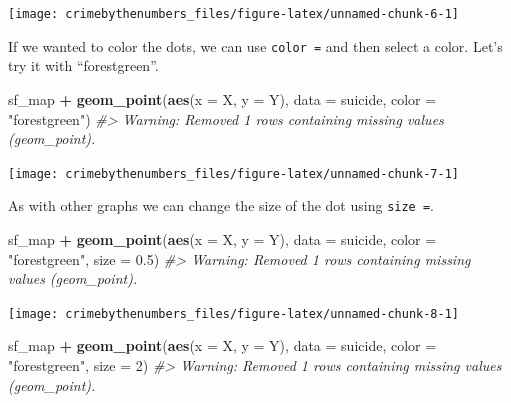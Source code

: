 \documentclass[
  12pt,
]{book}
\newenvironment{Shaded}{\begin{snugshade}}{\end{snugshade}}
\newcommand{\CommentTok}[1]{\textcolor[rgb]{0.37,0.37,0.37}{\textit{#1}}}
\newcommand{\DataTypeTok}[1]{\textcolor[rgb]{0.27,0.27,0.27}{#1}}
\newcommand{\DecValTok}[1]{\textcolor[rgb]{0.06,0.06,0.06}{#1}}
\newcommand{\FloatTok}[1]{\textcolor[rgb]{0.06,0.06,0.06}{#1}}
\newcommand{\KeywordTok}[1]{\textcolor[rgb]{0.27,0.27,0.27}{\textbf{#1}}}
\newcommand{\NormalTok}[1]{#1}
\newcommand{\OperatorTok}[1]{\textcolor[rgb]{0.43,0.43,0.43}{\textbf{#1}}}
\newcommand{\StringTok}[1]{\textcolor[rgb]{0.5,0.5,0.5}{#1}}
\begin{document}
\begin{center}\texttt{[image: crimebythenumbers\_files/figure-latex/unnamed-chunk-6-1]} \end{center}

If we wanted to color the dots, we can use \texttt{color\ =} and then select a color. Let's try it with ``forestgreen''.

\begin{Shaded}
\begin{Highlighting}[]
\NormalTok{sf\_map }\OperatorTok{+}
\StringTok{  }\KeywordTok{geom\_point}\NormalTok{(}\KeywordTok{aes}\NormalTok{(}\DataTypeTok{x =}\NormalTok{ X, }\DataTypeTok{y =}\NormalTok{ Y),}
             \DataTypeTok{data  =}\NormalTok{ suicide,}
             \DataTypeTok{color =} \StringTok{"forestgreen"}\NormalTok{)}
\CommentTok{\#> Warning: Removed 1 rows containing missing values (geom\_point).}
\end{Highlighting}
\end{Shaded}

\begin{center}\texttt{[image: crimebythenumbers\_files/figure-latex/unnamed-chunk-7-1]} \end{center}

As with other graphs we can change the size of the dot using \texttt{size\ =}.

\begin{Shaded}
\begin{Highlighting}[]
\NormalTok{sf\_map }\OperatorTok{+}
\StringTok{  }\KeywordTok{geom\_point}\NormalTok{(}\KeywordTok{aes}\NormalTok{(}\DataTypeTok{x =}\NormalTok{ X, }\DataTypeTok{y =}\NormalTok{ Y),}
             \DataTypeTok{data  =}\NormalTok{ suicide,}
             \DataTypeTok{color =} \StringTok{"forestgreen"}\NormalTok{,}
             \DataTypeTok{size  =} \FloatTok{0.5}\NormalTok{)}
\CommentTok{\#> Warning: Removed 1 rows containing missing values (geom\_point).}
\end{Highlighting}
\end{Shaded}

\begin{center}\texttt{[image: crimebythenumbers\_files/figure-latex/unnamed-chunk-8-1]} \end{center}

\begin{Shaded}
\begin{Highlighting}[]
\NormalTok{sf\_map }\OperatorTok{+}
\StringTok{  }\KeywordTok{geom\_point}\NormalTok{(}\KeywordTok{aes}\NormalTok{(}\DataTypeTok{x =}\NormalTok{ X, }\DataTypeTok{y =}\NormalTok{ Y),}
             \DataTypeTok{data  =}\NormalTok{ suicide,}
             \DataTypeTok{color =} \StringTok{"forestgreen"}\NormalTok{,}
             \DataTypeTok{size  =} \DecValTok{2}\NormalTok{)}
\CommentTok{\#> Warning: Removed 1 rows containing missing values (geom\_point).}
\end{Highlighting}
\end{Shaded}
\end{document}

